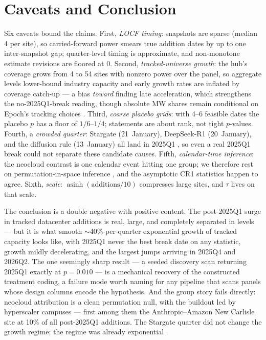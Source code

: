 \documentclass[11pt]{article}
\begin{document}
\section{Caveats and Conclusion}\label{sec:conclusion}

Six caveats bound the claims. First, \emph{LOCF timing}: snapshots are sparse
(median 4 per site), so carried-forward power smears true addition dates by
up to one inter-snapshot gap; quarter-level timing is approximate, and
non-monotone estimate revisions are floored at 0. Second,
\emph{tracked-universe growth}: the hub's coverage grows from 4 to 54 sites
with nonzero power over the panel, so aggregate levels lower-bound industry
capacity and early growth rates are inflated by coverage catch-up --- a bias
\emph{toward} finding late acceleration, which strengthens the
no-2025Q1-break reading, though absolute MW shares remain conditional on
Epoch's tracking choices \cite{epochdc}. Third, \emph{coarse placebo grids}:
with 4--6 feasible dates the placebo $p$ has a floor of $1/6$--$1/4$;
statements are about rank, not tight $p$-values. Fourth, a \emph{crowded
quarter}: Stargate (21~January), DeepSeek-R1 (20~January), and the diffusion
rule (13~January) all land in 2025Q1 \cite{openai2025,deepseekr1}, so even a
real 2025Q1 break could not separate these candidate causes. Fifth,
\emph{calendar-time inference}: the neocloud contrast is one calendar event
hitting one group; we therefore rest on permutation-in-space inference
\cite{conleytaber2011}, and the asymptotic CR1 statistics happen to agree.
Sixth, \emph{scale}: $\operatorname{asinh}(\text{additions}/10)$ compresses
large sites, and $\tau$ lives on that scale.

The conclusion is a double negative with positive content. The post-2025Q1
surge in tracked datacenter additions is real, large, and completely
separated in levels --- but it is what smooth $\sim$40\%-per-quarter
exponential growth of tracked capacity looks like, with 2025Q1 never the best
break date on any statistic, growth mildly decelerating, and the largest
jumps arriving in 2025Q4 and 2026Q2. The one seemingly sharp result --- a
seeded discovery scan returning 2025Q1 exactly at $p=0.010$ --- is a
mechanical recovery of the constructed treatment coding, a failure mode worth
naming for any pipeline that scans panels whose design columns encode the
hypothesis. And the group story fails directly: neocloud attribution is a
clean permutation null, with the buildout led by hyperscaler campuses ---
first among them the Anthropic--Amazon New Carlisle site at 10\% of all
post-2025Q1 additions. The Stargate quarter did not change the growth regime;
the regime was already exponential \cite{pilz2025,iea2025}.
\end{document}
